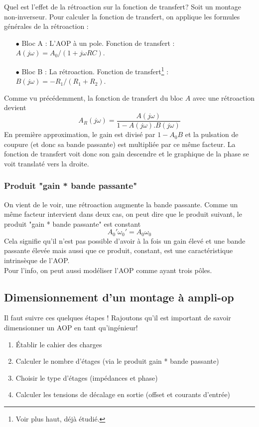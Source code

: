 		Quel est l'effet de la rétroaction sur la fonction de transfert? Soit un 
		montage non-inverseur. Pour calculer la fonction de transfert, on applique 
		les formules générales de la rétroaction :
		\begin{itemize}
		\item[$\bullet$] Bloc A : L'AOP à un pole. Fonction de transfert : $A(j\omega) 
		= A_0/(1+j\omega RC)$.
		\item[$\bullet$] Bloc B : La rétroaction. Fonction de transfert\footnote{Voir 
		plus haut, déjà étudié.} : $B(j\omega) = -R_1/(R_1+R_2)$.
		\end{itemize}
		Comme vu précédemment, la fonction de transfert du bloc $A$ avec une rétroaction 
		devient 
		\begin{equation}
		A_R(j\omega) = \dfrac{A(j\omega)}{1-A(j\omega).B(j\omega)}
		\end{equation}
		En première approximation, le gain est divisé par $1-A_0B$ et la pulsation de 
		coupure (et donc sa bande passante) est multipliée par ce même facteur. La fonction 
		de transfert voit donc 	son gain descendre et le graphique de la phase se voit translaté 
		vers la droite.
	
	
		\subsubsection{Produit "gain * bande passante"}
		On vient de le voir, une rétroaction augmente la bande passante. Comme un 
		même facteur intervient dans deux cas, on peut dire que le produit suivant, 
		le produit "gain * bande passante" est constant 
		\begin{equation}
		A_0'\omega_0' = A_0\omega_0
		\end{equation}
		Cela signifie qu'il n'est pas possible d'avoir à la fois un gain élevé et une 
		bande passante élevée mais aussi que ce produit, constant, est une caractéristique 
		intrinsèque de l'AOP.\\
		Pour l'info, on peut aussi modéliser l'AOP comme ayant trois pôles.
		
	\setcounter{subsection}{3}
	\subsection{Dimensionnement d'un montage à ampli-op}
	Il faut suivre ces quelques étapes ! Rajoutons qu'il est important de savoir 
	dimensionner un AOP en tant qu'ingénieur!
	\begin{enumerate}
	\item Établir le cahier des charges
	\item Calculer le nombre d'étages (via le produit gain * bande passante)
	\item Choisir le type d'étages (impédances et phase)
	\item Calculer les tensions de décalage en sortie (offset et courants d'entrée)
	\end{enumerate}
	
	
	
	
	
	
	
	
	
	
	
	
	
	
	
	
	
